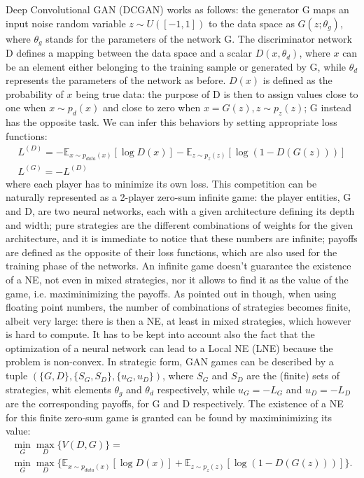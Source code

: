 Deep Convolutional GAN (DCGAN) works as follows: the generator G maps an input noise random variable $z\sim U([-1,1])$ to the data space as $G(z;\theta_g)$, where $\theta_g$ stands for the parameters of the network G. The discriminator network D defines a mapping between the data space and a scalar $D(x,\theta_d)$, where $x$ can be an element either belonging to the training sample or generated by G, while $\theta_d$ represents the parameters of the network as before. $D(x)$ is defined as the probability of $x$ being true data: the purpose of D is then to assign values close to one when $x\sim p_d(x)$ and close to zero when $x=G(z), z\sim p_z(z)$; G instead has the opposite task. We can infer this behaviors by setting appropriate loss functions:
\begin{align*}
L^{(D)} = -\mathbb{E}_{x \sim p_{data}(x)}[\log D(x)] - \mathbb{E}_{z \sim p_{z}(z)}[\log (1-D(G(z)))]\\
L^{(G)} = - L^{(D)}
\end{align*}
where each player has to minimize its own loss.
This competition can be naturally represented as a 2-player zero-sum infinite game: the player entities, G and D, are two neural networks, each with a given architecture defining its depth and width; pure strategies are the different combinations of weights for the given architecture, and it is immediate to notice that these numbers are infinite; payoffs are defined as the opposite of their loss functions, which are also used for the training phase of the networks.
An infinite game doesn't guarantee the existence of a NE, not even in mixed strategies, nor it allows to find it as the value of the game, i.e. maximinimizing the payoffs. As pointed out in  \cite{2017arXiv171200679O} though, when using floating point numbers, the number of combinations of strategies becomes finite, albeit very large: there is then a NE, at least in mixed strategies, which however is hard to compute. It has to be kept into account also the fact that the optimization of a neural network can lead to a Local NE (LNE) because the problem is non-convex.
In strategic form, GAN games can be described by a tuple $(\{G, D\}, \{S_G, S_D\}, \{u_G, u_D\})$, where $S_G$ and $S_D$ are the (finite) sets of strategies, whit elements $\theta_g$ and $\theta_d$ respectively, while $u_G=-L_G$ and $u_D=-L_D$ are the corresponding payoffs, for G and D respectively.
The existence of a NE for this finite zero-sum game is granted can be found by maximinimizing its value:
\begin{align*}
\min\limits_{G} \max\limits_{D} \big\{V(D,G)\big\} =\\ \min\limits_{G} \max\limits_{D} \Big\{\mathbb{E}_{x \sim p_{data}(x)}[\log D(x)] + \mathbb{E}_{z \sim p_{z}(z)}[\log (1-D(G(z)))] \Big\}.
\end{align*}
